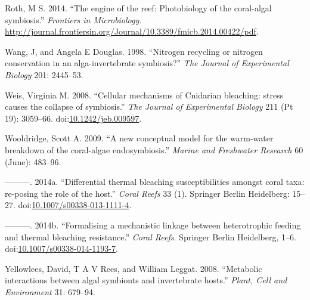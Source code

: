 \documentclass[]{elsarticle} %
\begin{document}
\hypertarget{ref-Roth:2014wf}{}
Roth, M S. 2014. ``The engine of the reef: Photobiology of the
coral-algal symbiosis.'' \emph{Frontiers in Microbiology}.
\url{http://journal.frontiersin.org/Journal/10.3389/fmicb.2014.00422/pdf}.

\hypertarget{ref-Wang:1998p128}{}
Wang, J, and Angela E Douglas. 1998. ``Nitrogen recycling or nitrogen
conservation in an alga-invertebrate symbiosis?'' \emph{The Journal of
Experimental Biology} 201: 2445--53.

\hypertarget{ref-Weis:2008p944}{}
Weis, Virginia M. 2008. ``Cellular mechanisms of Cnidarian bleaching:
stress causes the collapse of symbiosis.'' \emph{The Journal of
Experimental Biology} 211 (Pt 19): 3059--66.
doi:\href{https://doi.org/10.1242/jeb.009597}{10.1242/jeb.009597}.

\hypertarget{ref-Wooldridge:2009p7807}{}
Wooldridge, Scott A. 2009. ``A new conceptual model for the warm-water
breakdown of the coral-algae endosymbiosis.'' \emph{Marine and
Freshwater Research} 60 (June): 483--96.

\hypertarget{ref-Wooldridge:2014di}{}
---------. 2014a. ``Differential thermal bleaching susceptibilities
amongst coral taxa: re-posing the role of the host.'' \emph{Coral Reefs}
33 (1). Springer Berlin Heidelberg: 15--27.
doi:\href{https://doi.org/10.1007/s00338-013-1111-4}{10.1007/s00338-013-1111-4}.

\hypertarget{ref-Wooldridge:2014hc}{}
---------. 2014b. ``Formalising a mechanistic linkage between
heterotrophic feeding and thermal bleaching resistance.'' \emph{Coral
Reefs}. Springer Berlin Heidelberg, 1--6.
doi:\href{https://doi.org/10.1007/s00338-014-1193-7}{10.1007/s00338-014-1193-7}.

\hypertarget{ref-Yellowlees:2008p331}{}
Yellowlees, David, T A V Rees, and William Leggat. 2008. ``Metabolic
interactions between algal symbionts and invertebrate hosts.''
\emph{Plant, Cell and Environment} 31: 679--94.
\end{document}

